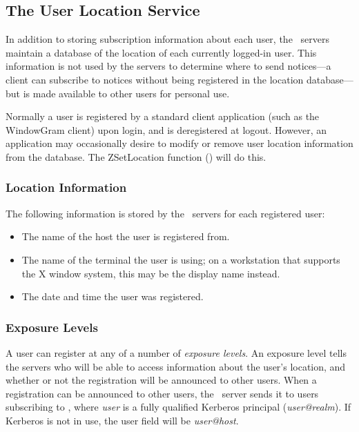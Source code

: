 %
\subsection{The User Location Service}
\label{user-location}

In addition to storing subscription information about each user, the
\Zephyr\ servers maintain a database of the location of each
currently logged-in user.  This information is not used by the servers to
determine where to send notices---a client can subscribe to notices
without being registered in the location database---but is made
available to other users for personal use.

Normally a user is registered by a standard client application (such
as the WindowGram client) upon login, and is deregistered at logout.
However, an application may occasionally desire to modify or remove
user location information from the database.  The ZSetLocation
function () will do this.

\subsubsection{Location Information}

The following information is stored by the \Zephyr\ servers for each
registered user:

\begin{itemize}
\item The name of the host the user is registered from.
\item The name of the terminal the user is using; on a workstation that
supports the X window system, this may be the display name instead.
\item The date and time the user was registered.
\end{itemize}

\subsubsection{Exposure Levels}
\label{exposure-levels}

A user can register at any of a number of {\em exposure levels\/}.  An
exposure level tells the servers who will be able to access
information about the user's location, and whether or not the
registration will be announced to other users.  When a registration
can be announced to other users, the \Zephyr\ server sends it to users
subscribing to , where {\em user\/} is a
fully qualified Kerberos principal ({\em user@realm}).  If Kerberos is
not in use, the user field will be {\em user@host}.

